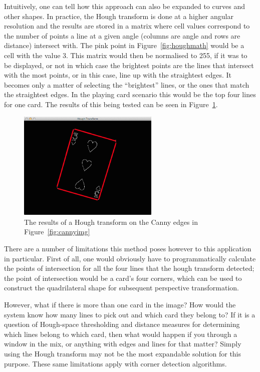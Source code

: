 \documentclass[a4paper,12pt,notitlepage]{article}
\begin{document}
			Intuitively, one can tell how this approach can also be expanded to curves and other shapes. In practice, the Hough transform is done at a higher angular resolution and the results are stored in a matrix where cell values correspond to the number of points a line at a given angle (columns are angle and rows are distance) intersect with. The pink point in Figure~\ref{fig:houghmath} would be a cell with the value 3. This matrix would then be normalised to 255, if it was to be displayed, or not in which case the brightest points are the lines that intersect with the most points, or in this case, line up with the straightest edges. It becomes only a matter of selecting the ``brightest'' lines, or the ones that match the straightest edges. In the playing card scenario this would be the top four lines for one card. The results of this being tested can be seen in Figure~\ref{fig:hough}.

			\begin{figure}[H]
				\centering
				\includegraphics[width=0.6\textwidth]{hough}
				\caption{The results of a Hough transform on the Canny edges in Figure~\ref{fig:cannyimg}}
				\label{fig:hough}
			\end{figure}

			There are a number of limitations this method poses however to this application in particular. First of all, one would obviously have to programmatically calculate the points of intersection for all the four lines that the hough transform detected; the point of intersection would be a card's four corners, which can be used to construct the quadrilateral shape for subsequent perspective transformation.

			However, what if there is more than one card in the image? How would the system know how many lines to pick out and which card they belong to? If it is a question of Hough-space thresholding and distance measures for determining which lines belong to which card, then what would happen if you through a window in the mix, or anything with edges and lines for that matter? Simply using the Hough transform may not be the most expandable solution for this purpose. These same limitations apply with corner detection algorithms.
\end{document}
